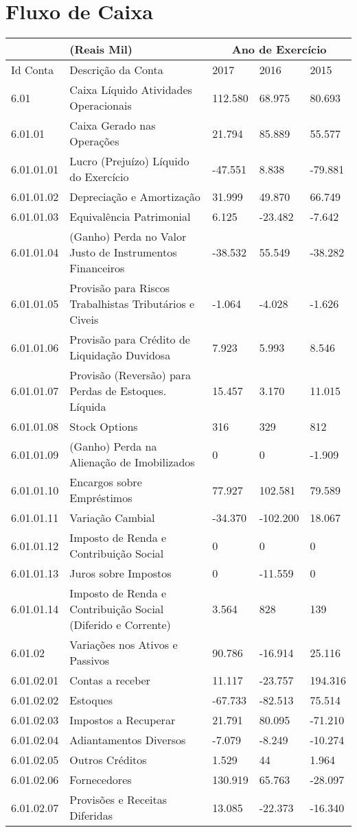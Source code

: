 \vspace*{-60pt}
\section{Fluxo de Caixa}

\begin{center}
\begin{longtable}{p{}|p{}|p{}|p{}|p{}}
\hline 
 & (Reais Mil) & \multicolumn{3}{c}{Ano de Exercício}\tabularnewline
\hline 
Id Conta & Descrição da Conta & 2017 & 2016 & 2015\tabularnewline
\hline 
6.01 & Caixa Líquido Atividades Operacionais & 112.580 & 68.975 & 80.693\tabularnewline
6.01.01 & Caixa Gerado nas Operações & 21.794 & 85.889 & 55.577\tabularnewline
6.01.01.01 & Lucro (Prejuízo) Líquido do Exercício & -47.551 & 8.838 & -79.881\tabularnewline
6.01.01.02 & Depreciação e Amortização & 31.999 & 49.870 & 66.749\tabularnewline
6.01.01.03 & Equivalência Patrimonial & 6.125 & -23.482 & -7.642\tabularnewline
6.01.01.04 & (Ganho) Perda no Valor Justo de Instrumentos Financeiros & -38.532 & 55.549 & -38.282\tabularnewline
6.01.01.05 & Provisão para Riscos Trabalhistas Tributários e Civeis & -1.064 & -4.028 & -1.626\tabularnewline
6.01.01.06 & Provisão para Crédito de Liquidação Duvidosa & 7.923 & 5.993 & 8.546\tabularnewline
6.01.01.07 & Provisão (Reversão) para Perdas de Estoques. Líquida & 15.457 & 3.170 & 11.015\tabularnewline
6.01.01.08 & Stock Options & 316 & 329 & 812\tabularnewline
6.01.01.09 & (Ganho) Perda na Alienação de Imobilizados & 0 & 0 & -1.909\tabularnewline
6.01.01.10 & Encargos sobre Empréstimos & 77.927 & 102.581 & 79.589\tabularnewline
6.01.01.11 & Variação Cambial & -34.370 & -102.200 & 18.067\tabularnewline
6.01.01.12 & Imposto de Renda e Contribuição Social & 0 & 0 & 0\tabularnewline
6.01.01.13 & Juros sobre Impostos & 0 & -11.559 & 0\tabularnewline
6.01.01.14 & Imposto de Renda e Contribuição Social (Diferido e Corrente) & 3.564 & 828 & 139\tabularnewline
6.01.02 & Variações nos Ativos e Passivos & 90.786 & -16.914 & 25.116\tabularnewline
6.01.02.01 & Contas a receber & 11.117 & -23.757 & 194.316\tabularnewline
6.01.02.02 & Estoques & -67.733 & -82.513 & 75.514\tabularnewline
6.01.02.03 & Impostos a Recuperar & 21.791 & 80.095 & -71.210\tabularnewline
6.01.02.04 & Adiantamentos Diversos & -7.079 & -8.249 & -10.274\tabularnewline
6.01.02.05 & Outros Créditos & 1.529 & 44 & 1.964\tabularnewline
6.01.02.06 & Fornecedores & 130.919 & 65.763 & -28.097\tabularnewline
6.01.02.07 & Provisões e Receitas Diferidas & 13.085 & -22.373 & -16.340\tabularnewline

\end{longtable}
\end{center}
